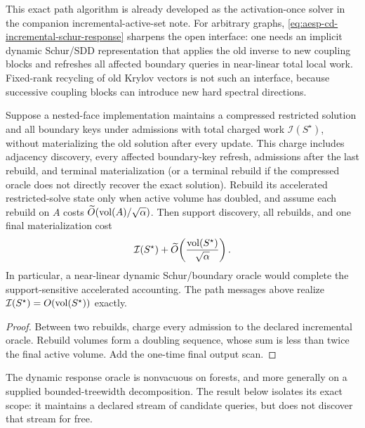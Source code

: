 This exact path algorithm is already developed as the activation-once solver
in the companion incremental-active-set note.  For arbitrary graphs,
\cref{eq:aesp-cd-incremental-schur-response} sharpens the open interface:
one needs an implicit dynamic Schur/SDD representation that applies the old
inverse to new coupling blocks and refreshes all affected boundary queries in
near-linear total local work.  Fixed-rank recycling of old Krylov vectors is
not such an interface, because successive coupling blocks can introduce new
hard spectral directions.

\begin{corollary}
\label{cor:aesp-cd-dynamic-schur-doubling-interface}
Suppose a nested-face implementation maintains a compressed restricted
solution and all boundary keys under admissions with total charged work
$\mathcal I(S^\star)$, without materializing the old solution after every
update.  This charge includes adjacency discovery, every affected
boundary-key refresh, admissions after the last rebuild, and terminal
materialization (or a terminal rebuild if the compressed oracle does not
directly recover the exact solution).  Rebuild its accelerated
restricted-solve state only when active
volume has doubled, and assume each rebuild on $A$ costs
$\widetilde O(\operatorname{vol}(A)/\sqrt\alpha)$.  Then support discovery, all rebuilds,
and one final materialization cost
\begin{equation*}
 \mathcal I(S^\star)
 +\widetilde O\!\left(\frac{\operatorname{vol}(S^\star)}{\sqrt\alpha}\right).
\end{equation*}
In particular, a near-linear dynamic Schur/boundary oracle would complete the
support-sensitive accelerated accounting.  The path messages above realize
$\mathcal I(S^\star)=O(\operatorname{vol}(S^\star))$ exactly.
\end{corollary}

\begin{proof}
Between two rebuilds, charge every admission to the declared incremental
oracle.  Rebuild volumes form a doubling sequence, whose sum is less than
twice the final active volume.  Add the one-time final output scan.
\end{proof}

The dynamic response oracle is nonvacuous on forests, and more generally on
a supplied bounded-treewidth decomposition.  The result below isolates its
exact scope: it maintains a declared stream of candidate queries, but does
not discover that stream for free.

